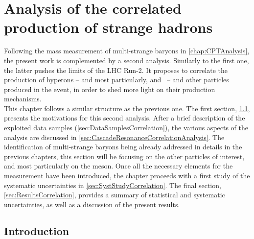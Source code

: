 \chapter{Analysis of the correlated production of strange hadrons}
\label{chap:CorrelatedAnalysis}

Following the mass measurement of multi-strange baryons in  \chap\ref{chap:CPTAnalysis}, the present work is complemented by a second analysis. Similarly to the first one, the latter pushes the limits of the LHC Run-2. It proposes to correlate the production of hyperons -- and most particularly, \rmXi and \rmOmega\ -- and other particles produced in the event, in order to shed more light on their production mechanisms.\\

This chapter follows a similar structure as the previous one. The first section, \Sec\ref{sec:IntroductionCorrelation}, presents the motivations for this second analysis. After a brief description of the exploited data samples (\Sec\ref{sec:DataSamplesCorrelation}), the various aspects of the analysis are discussed in \Sec\ref{sec:CascadeResonanceCorrelationAnalysis}. The identification of multi-strange baryons being already addressed in details in the previous chapters, this section will be focusing on the other particles of interest, and most particularly on the \rmPhiMes meson. Once all the necessary elements for the measurement have been introduced, the chapter proceeds with a first study of the systematic uncertainties in \Sec\ref{sec:SystStudyCorrelation}. The final section, \Sec\ref{sec:ResultsCorrelation}, provides a summary of statistical and systematic uncertainties, as well as a discussion of the present results.

\section{Introduction}
\label{sec:IntroductionCorrelation}

